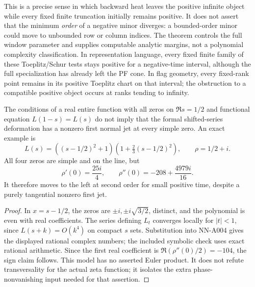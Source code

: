 This is a precise sense in which backward heat leaves the positive
infinite object while every fixed finite truncation initially remains
positive. It does not assert that the minimum \emph{order} of a negative
minor diverges: a bounded-order minor could move to unbounded row or
column indices. The theorem controls the full window parameter and
supplies computable analytic margins, not a polynomial complexity
classification. In representation language, every fixed finite family
of these Toeplitz/Schur tests stays positive for a negative-time interval,
although the full specialization has already left the PF cone. In flag
geometry, every fixed-rank point remains in its positive Toeplitz chart
on that interval; the obstruction to a compatible positive object
occurs at ranks tending to infinity.

\begin{proposition}
The conditions of a real entire function with all zeros on
$\Re s=1/2$ and functional equation $L(1-s)=L(s)$ do not imply that
the formal shifted-series deformation has a nonzero first normal jet
at every simple zero. An exact example is
\[
 L(s)=((s-1/2)^2+1)(1+\tfrac23(s-1/2)^2),\qquad \rho=1/2+i.
\]
All four zeros are simple and on the line, but
\[
 \rho'(0)=\frac{25i}{4},\qquad
 \rho''(0)=-208+\frac{4979i}{16}.
\]
It therefore moves to the left at second order for small positive
time, despite a purely tangential nonzero first jet.
\end{proposition}
\begin{proof}
In $x=s-1/2$, the zeros are $\pm i,\pm i\sqrt{3/2}$, distinct,
and the polynomial is even with real coefficients.
The series defining $L_t$ converges locally for $|t|<1$, since
$L(s+k)=O(k^4)$ on compact $s$ sets. Substitution into NN-A004 gives
the displayed rational complex numbers; the included symbolic check
uses exact rational arithmetic. Since the first real coefficient is
$\Re(\rho''(0)/2)=-104$, the sign claim follows.
This model has no asserted Euler product. It does not refute
transversality for the actual zeta function; it isolates the extra
phase-nonvanishing input needed for that assertion.
\end{proof}
